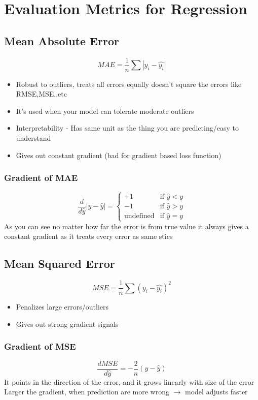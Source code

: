 \documentclass[12pt]{extarticle}
\begin{document}
\section{Evaluation Metrics for Regression}

\subsection{Mean Absolute Error}  

$$MAE = \frac{1}{n}\sum{|y_i - \hat{y_i}|}$$ 
\begin{itemize}
    \item Robust to outliers, treats all errors equally doesn’t square the errors like RMSE,MSE..etc 
    \item It’s used when your model can tolerate moderate outliers  
    \item Interpretability - Has same unit as the thing you are predicting/easy to understand 
    \item Gives out constant gradient (bad for gradient based loss function) 
\end{itemize}
 
\subsubsection{Gradient of MAE} 
$$
\frac{d}{d\hat{y}}|y - \hat{y}| = 
\begin{cases} 
+1 & \text{if }  \hat{y} < y \\ 
-1 & \text{if }  \hat{y} > y \\ 
\text{undefined} & \text{if } \hat{y} = y 
\end{cases} 
$$
As you can see no matter how far the error is from true value it always gives a constant gradient as it treats every error as same
stics
\subsection{Mean Squared Error}
$$MSE = \frac{1}{n}\sum{(y_i - \hat{y_i})^2}$$ 
\begin{itemize}
    \item Penalizes large errors/outliers 
    \item Gives out strong gradient signals  
\end{itemize}
\subsubsection{Gradient of MSE}
$$\frac{d MSE}{d\hat{y}} = -\frac{2}{n}(y-\hat{y})$$
It points in the direction of the error, and it grows linearly with size of the error
Larger the gradient, when prediction are more wrong \(\longrightarrow\) model adjusts faster
\end{document}
